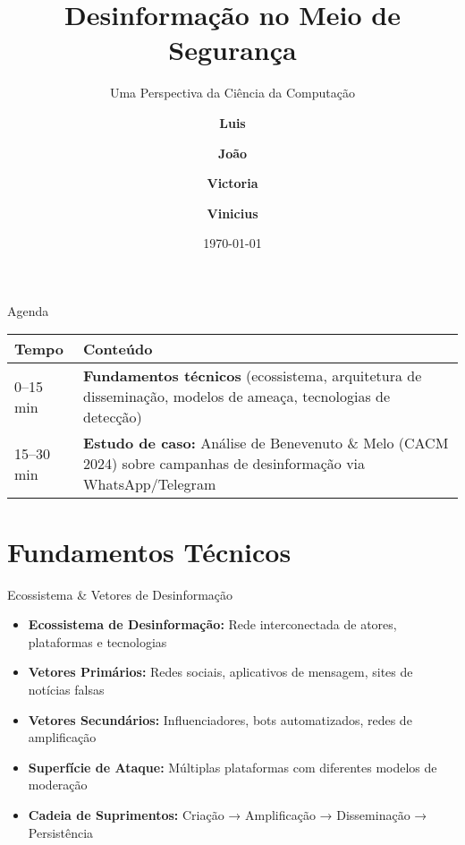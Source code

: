 \documentclass[aspectratio=169,xcolor=table]{beamer}
\author[Luis, João, Victoria, Vinicius]{%
  \textbf{Luis} \and \textbf{João} \and \textbf{Victoria} \and \textbf{Vinicius}
}
\title{Desinformação no Meio de Segurança}
\subtitle{Uma Perspectiva da Ciência da Computação}
\institute{Universidade Federal da Bahia \\ Instituto de Computação}
\date{\today}
\begin{document}
\begin{frame}
    \titlepage
\end{frame}

\begin{frame}{Agenda}
    \begin{table}
        \begin{tabularx}{\textwidth}{|l|X|}
            \hline
            \textbf{Tempo} & \textbf{Conteúdo} \\
            \hline
            0–15 min  & \textbf{Fundamentos técnicos} (ecossistema, arquitetura de disseminação, modelos de ameaça, tecnologias de detecção) \\
            \hline
            15–30 min & \textbf{Estudo de caso:} Análise de Benevenuto \& Melo (CACM 2024) sobre campanhas de desinformação via WhatsApp/Telegram \\
            \hline
        \end{tabularx}
    \end{table}
\end{frame}

\setlength{\parskip}{1em}

\section{Fundamentos Técnicos}
\begin{frame}{Ecossistema \& Vetores de Desinformação}
    \begin{itemize}
        \item \textbf{Ecossistema de Desinformação:} Rede interconectada de atores, plataformas e tecnologias
        \item \textbf{Vetores Primários:} Redes sociais, aplicativos de mensagem, sites de notícias falsas
        \item \textbf{Vetores Secundários:} Influenciadores, bots automatizados, redes de amplificação
        \item \textbf{Superfície de Ataque:} Múltiplas plataformas com diferentes modelos de moderação
        \item \textbf{Cadeia de Suprimentos:} Criação → Amplificação → Disseminação → Persistência
    \end{itemize}
\end{frame}
\end{document}
